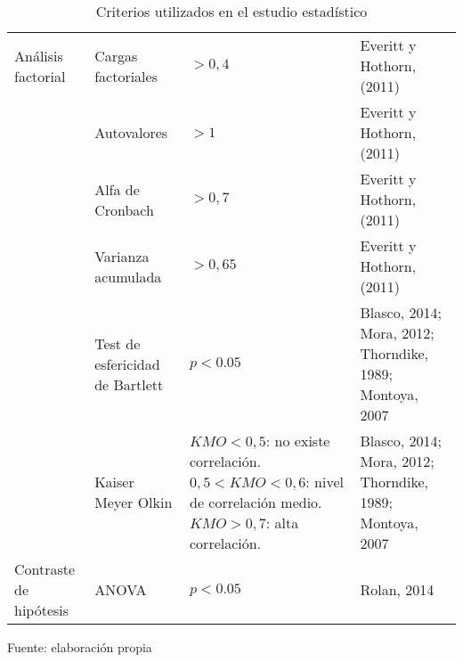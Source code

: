 \begin{table}[h]
    \caption {Criterios utilizados en el estudio estadístico}
	\label{tab:criterios}
	\setlength\extrarowheight{5pt}
	
	\begin{tabular}{p{2.1cm} p{3.5cm} p{4.2cm} p{4.1cm}}
	\toprule
	Análisis factorial	& Cargas factoriales	& $ > 0,4 $	& Everitt y Hothorn, (2011)	\\
						& Autovalores			& $ > 1 $		& Everitt y Hothorn, (2011)	\\
						& Alfa de Cronbach		& $ > 0,7 $	& Everitt y Hothorn, (2011)	\\
						& Varianza acumulada	& $ > 0,65 $	& Everitt y Hothorn, (2011)	\\
						& Test de esfericidad de Bartlett & $ p < 0.05 $ & Blasco, 2014; Mora, 2012; Thorndike, 1989; Montoya, 2007	\\
						& Kaiser Meyer Olkin	& \pbox{4.2cm}{
						$ KMO < 0,5 $: no existe correlación. \\
						$ 0,5 < KMO < 0,6 $: nivel de correlación medio. \\
						$ KMO > 0,7 $: alta correlación. \\
						} & Blasco, 2014; Mora, 2012; Thorndike, 1989; Montoya, 2007	\\
	\midrule
	Contraste de hipótesis	& ANOVA				& $ p < 0.05 $	& Rolan, 2014 \\
	\bottomrule
	\end{tabular}
	
	\center
	\footnotesize
	Fuente: elaboración propia
\end{table}
